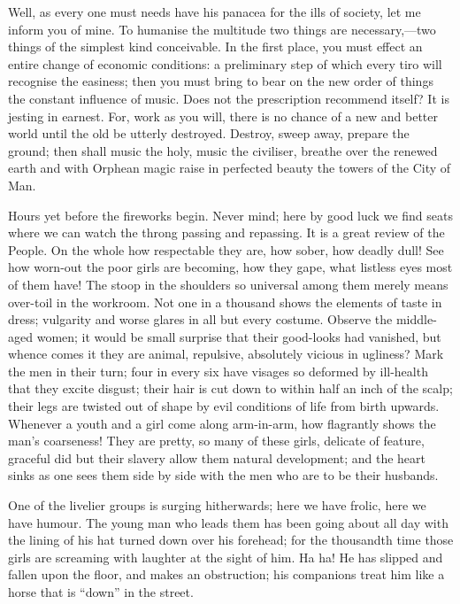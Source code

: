 Well, as every one must needs have his panacea for the ills of society,
let me inform you of mine. To humanise the multitude two things are
necessary,---two things of the simplest kind conceivable. In the first
place, you must effect an entire change of economic conditions: a
preliminary step of which every tiro will recognise the easiness; then
you {}must bring to bear on the new order of things the constant
influence of music. Does not the prescription recommend itself? It is
jesting in earnest. For, work as you will, there is no chance of a new
and better world until the old be utterly destroyed. Destroy, sweep
away, prepare the ground; then shall music the holy, music the
civiliser, breathe over the renewed earth and with Orphean magic raise
in perfected beauty the towers of the City of Man.

Hours yet before the fireworks begin. Never mind; here by good luck we
find seats where we can watch the throng passing and repassing. It is a
great review of the People. On the whole how respectable they are, how
sober, how deadly dull! See how worn-out the poor girls are becoming,
how they gape, what listless eyes most of them have! The stoop in the
shoulders so universal among them merely means over-toil in the
workroom. Not one in a thousand shows the elements of taste in dress;
vulgarity and worse glares in all but every costume. Observe the
{}middle-aged women; it would be small surprise that their good-looks
had vanished, but whence comes it they are animal, repulsive, absolutely
vicious in ugliness? Mark the men in their turn; four in every six have
visages so deformed by ill-health that they excite disgust; their hair
is cut down to within half an inch of the scalp; their legs are twisted
out of shape by evil conditions of life from birth upwards. Whenever a
youth and a girl come along arm-in-arm, how flagrantly shows the man's
coarseness! They are pretty, so many of these girls, delicate of
feature, graceful did but their slavery allow them natural development;
and the heart sinks as one sees them side by side with the men who are
to be their husbands.

One of the livelier groups is surging hitherwards; here we have frolic,
here we have humour. The young man who leads them has been going about
all day with the lining of his hat turned down over his forehead; for
the thousandth time those girls are screaming with laughter at the sight
of him. Ha ha! {}He has slipped and fallen upon the floor, and makes an
obstruction; his companions treat him like a horse that is ``down'' in
the street.

